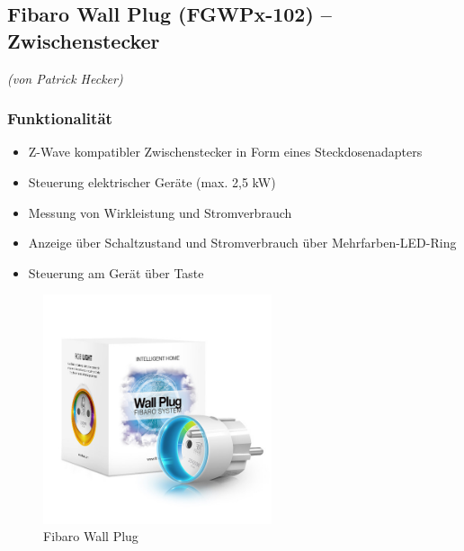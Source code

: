 

\subsection{Fibaro Wall Plug (FGWPx-102) – Zwischenstecker}

\emph{(von Patrick Hecker)}
\subsubsection{Funktionalität}
\begin{itemize}
	\item Z-Wave kompatibler Zwischenstecker in Form eines Steckdosenadapters
	\item Steuerung elektrischer Geräte (max. 2,5 kW)
	\item Messung von Wirkleistung und Stromverbrauch
	\item Anzeige über Schaltzustand und Stromverbrauch über Mehrfarben-LED-Ring
	\item Steuerung am Gerät über Taste
\end{itemize}

\begin{figure}[h!]
	\centering
	\includegraphics[width=0.6\textwidth]{img/Sensorevaluation/FibaroWallPlug.jpg}
	\caption{Fibaro Wall Plug}
	\label{fig:sensorenFibaroWallPlug}
\end{figure}

